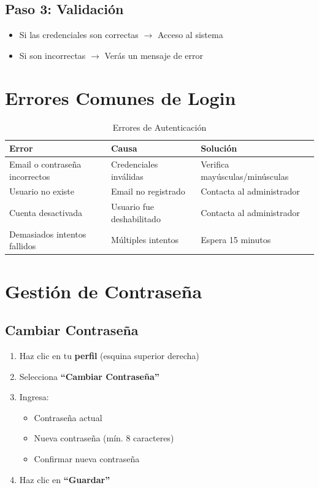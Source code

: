 \documentclass[12pt,a4paper,spanish,oneside]{report}
\begin{document}
\subsection{Paso 3: Validación}

\begin{itemize}
    \item[$\checkmark$] Si las credenciales son correctas $\rightarrow$ Acceso al sistema
    \item[$\times$] Si son incorrectas $\rightarrow$ Verás un mensaje de error
\end{itemize}

\section{Errores Comunes de Login}

\begin{table}[H]
\centering
\caption{Errores de Autenticación}
\begin{tabular}{|l|p{3cm}|p{4cm}|}
\hline
\textbf{Error} & \textbf{Causa} & \textbf{Solución} \\
\hline
Email o contraseña incorrectos & Credenciales inválidas & Verifica mayúsculas/minúsculas \\
\hline
Usuario no existe & Email no registrado & Contacta al administrador \\
\hline
Cuenta desactivada & Usuario fue deshabilitado & Contacta al administrador \\
\hline
Demasiados intentos fallidos & Múltiples intentos & Espera 15 minutos \\
\hline
\end{tabular}
\end{table}

\section{Gestión de Contraseña}

\subsection{Cambiar Contraseña}

\begin{enumerate}
    \item Haz clic en tu \textbf{perfil} (esquina superior derecha)
    \item Selecciona \textbf{``Cambiar Contraseña''}
    \item Ingresa:
    \begin{itemize}
        \item Contraseña actual
        \item Nueva contraseña (mín. 8 caracteres)
        \item Confirmar nueva contraseña
    \end{itemize}
    \item Haz clic en \textbf{``Guardar''}
\end{enumerate}
\end{document}
